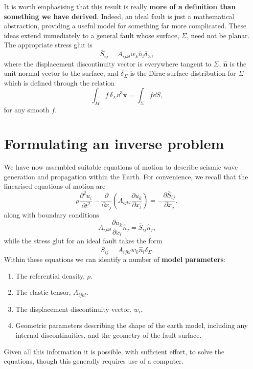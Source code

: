 It is worth emphasising that this result is really \textbf{more of a definition than something we have derived}. Indeed, an ideal 
fault is just a mathematical abstraction, providing a useful model for 
something far more complicated. These ideas extend immediately to a general fault whose surface, $\Sigma$, need not be planar. 
The appropriate stress glut is
\begin{equation}\label{eq:22}
\overline{S}_{ij} = A_{ijkl}w_{k}\hat{n}_{l}\delta_{\Sigma},
\end{equation}
where the displacement discontinuity vector is everywhere tangent to $\Sigma$, $\hat{\mathbf{n}}$ is the unit normal vector 
to the surface, and $\delta_{\Sigma}$ is the Dirac surface distribution for $\Sigma$ which is defined through the relation
\begin{equation}\label{eq:23}
\int_{M}f\,\delta_{\Sigma}\dd^{3}\mathbf{x} = \int_{\Sigma}f\dd S,
\end{equation}
for any smooth $f$.

\section*{Formulating an inverse problem}
We have now assembled suitable equations of motion to describe seismic wave generation and propagation 
within the Earth. For convenience, we recall that the linearised equations of motion are
\begin{equation}\label{eq:24}
\rho\frac{\partial^2 u_{i}}{\partial t^2} - \frac{\partial}{\partial x_{j}}\left(A_{ijkl}\frac{\partial u_{k}}{\partial x_{l}}\right) = -\frac{\partial\overline{S}_{ij}}{\partial x_{j}},
\end{equation}
along with boundary conditions
\begin{equation}\label{eq:25}
A_{ijkl}\frac{\partial u_{k}}{\partial x_{l}}\hat{n}_{j} = \overline{S}_{ij}\hat{n}_{j},
\end{equation}
while the stress glut for an ideal fault takes the form
\begin{equation}\label{eq:26}
\overline{S}_{ij} = A_{ijkl}w_{k}\hat{n}_{l}\delta_{\Sigma}.
\end{equation}
Within these equations we can identify a number of \textbf{model parameters}:
\begin{enumerate}
    \item The referential density, $\rho$.
    \item The elastic tensor, $A_{ijkl}$.
    \item The displacement discontinuity vector, $w_i$.
    \item Geometric parameters describing the shape of the earth model, including any internal discontinuities, and the geometry of the fault surface.
\end{enumerate}
Given all this information it is possible, with sufficient effort, to solve the equations, though this generally requires use of a computer. 

